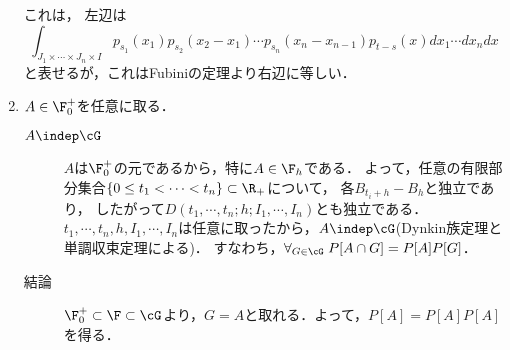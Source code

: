 \documentclass[uplatex,dvipdfmx]{jsreport}
\begin{document}
\begin{Proof}
\begin{enumerate}
        これは，%
        左辺は
        \[\int_{J_1\times\cdots\times J_n\times I}p_{s_1}(x_1)p_{s_2}(x_2-x_1)\cdots p_{s_n}(x_n-x_{n-1})p_{t-s}(x)dx_1\cdots dx_ndx\]
        と表せるが，これはFubiniの定理より右辺に等しい．
        \item 
        $A\in\F^+_0$を任意に取る．
        \begin{description}
            \item[$A\indep\cG$] $A$は$\F^+_0$の元であるから，特に$A\in\F_h$である．
            よって，任意の有限部分集合$\{0\le t_1<\cdots<t_n\}\subset\R_+$について，
            各$B_{t_i+h}-B_{h}$と独立であり，
            したがって$D(t_1,\cdots,t_n;h;I_1,\cdots,I_n)$とも独立である．
            $t_1,\cdots,t_n,h,I_1,\cdots,I_n$は任意に取ったから，$A\indep\cG$(Dynkin族定理と単調収束定理による)．
            すなわち，$\forall_{G\in\cG}\;P[A\cap G]=P[A]P[G]$．
            \item[結論] 
            $\F^+_0\subset\F\subset\cG$より，$G=A$と取れる．よって，$P[A]=P[A]P[A]$を得る．
        \end{description}
    \end{enumerate}
\end{Proof}
\end{document}
